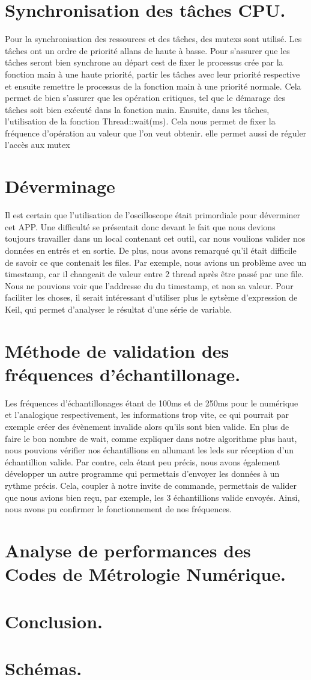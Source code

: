 \documentclass[12pt]{article}
\begin{document}
\section{Synchronisation des tâches CPU.}
Pour la synchronisation des ressources et des tâches, des mutexs sont utilisé. Les tâches ont un ordre de priorité allans de haute à basse. Pour s'assurer que les tâches seront bien synchrone au départ cest de fixer le processus crée par la fonction main à une haute priorité, partir les tâches avec leur priorité respective et ensuite remettre le processus de la fonction main à une priorité normale. Cela permet de bien s'assurer que les opération critiques, tel que le démarage des tâches soit bien exécuté dans la fonction main. Ensuite, dans les tâches, l'utilisation de la fonction Thread::wait(ms). Cela nous permet de fixer la fréquence d'opération au valeur que l'on veut obtenir. elle permet aussi de réguler l'accès aux mutex 

\section{Déverminage}
Il est certain que l'utilisation de l'oscilloscope était primordiale pour déverminer cet APP. Une difficulté se présentait donc devant le fait que nous devions toujours travailler dans un local contenant cet outil, car nous voulions valider nos données en entrés et en sortie. De plus, nous avons remarqué qu'il était difficile de savoir ce que contenait les files. Par exemple, nous avions un problème avec un timestamp, car il changeait de valeur entre 2 thread après être passé par une file. Nous ne pouvions voir que l'addresse du du timestamp, et non sa valeur. Pour faciliter les choses, il serait intéressant d'utiliser plus le sytsème d'expression de Keil, qui permet d'analyser le résultat d'une série de variable. 

\section{Méthode de validation des fréquences d'échantillonage.}
Les fréquences d'échantillonages étant de 100ms et de 250ms pour le numérique et l'analogique respectivement, les informations trop vite, ce qui pourrait par exemple créer des évènement invalide alors qu'ils sont bien valide. En plus de faire le bon nombre de wait, comme expliquer dans notre algorithme plus haut, nous pouvions vérifier nos échantillions en allumant les leds sur réception d'un échantillion valide. Par contre, cela étant peu précis, nous avons également développer un autre programme qui permettais d'envoyer les données à un rythme précis. Cela, coupler à notre invite de commande, permettais de valider que nous avions bien reçu, par exemple, les 3 échantillions valide envoyés. Ainsi, nous avons pu confirmer le fonctionnement de nos fréquences.

\section{Analyse de performances des Codes de Métrologie Numérique.}

\section{Conclusion.}
\section{Schémas.}
\end{document}
